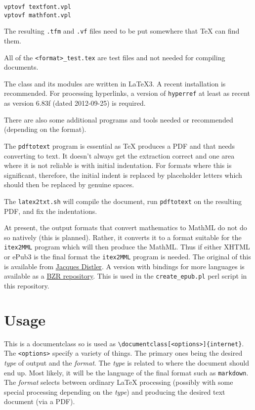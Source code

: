 \documentclass[github,text]{internet}
\begin{document}
\begin{verbatim}
vptovf textfont.vpl
vptovf mathfont.vpl
\end{verbatim}

The resulting \verb+.tfm+ and \verb+.vf+ files need to be put somewhere that \TeX{} can find them.

All of the \verb+<format>_test.tex+ are test files and not needed for compiling documents.

The class and its modules are written in \LaTeX3.
A recent installation is recommended.
For processing hyperlinks, a version of \verb+hyperref+ at least as recent as version 6.83f (dated 2012-09-25) is required.

There are also some additional programs and tools needed or recommended (depending on the format).

The \verb+pdftotext+ program is essential as \TeX{} produces a PDF and that needs converting to text.
It doesn't always get the extraction correct and one area where it is not reliable is with initial indentation.
For formats where this is significant, therefore, the initial indent is replaced by placeholder letters which should then be replaced by genuine spaces.

The \verb+latex2txt.sh+ will compile the document, run \verb+pdftotext+ on the resulting PDF, and fix the indentations.

At present, the output formats that convert mathematics to MathML do not do so natively  (this is planned).
Rather, it converts it to a format suitable for the \verb+itex2MML+ program which will then produce the MathML.
Thus if either XHTML or ePub3 is the final format the \verb+itex2MML+ program is needed.
The original of this is available from \href{http://golem.ph.utexas.edu/~distler/blog/itex2MML.html}{Jacques Distler}.
A version with bindings for more languages is available as a  \href{http://www.math.ntnu.no/~stacey/code/itexToMML/}{BZR repository}.
This is used in the \verb+create_epub.pl+ perl script in this repository.

\section{Usage}

This is a documentclass so is used as \verb+\documentclass[<options>]{internet}+.
The \verb+<options>+ specify a variety of things.
The primary ones being the desired \emph{type} of output and the \emph{format}.
The \emph{type} is related to where the document should end up.
Most likely, it will be the language of the final format such as \verb+markdown+.
The \emph{format} selects between ordinary \LaTeX{} processing (possibly with some special processing depending on the \emph{type}) and producing the desired text document (via a PDF).
\end{document}

